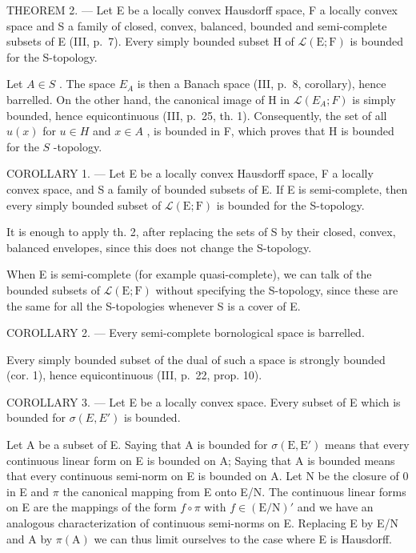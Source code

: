 THEOREM 2. --- Let E be a locally convex Hausdorff space, F a locally convex space and S a family of closed, convex, balanced, bounded and semi-complete subsets of E (III, p.~7). Every simply bounded subset H of \(\mathcal{L}(\mathrm{E};\mathrm{F})\) is bounded for the S-topology.

Let \(A \in S\) . The space \(E_A\) is then a Banach space (III, p.~8, corollary), hence barrelled. On the other hand, the canonical image of H in \(\mathcal{L}(E_A; F)\) is simply bounded, hence equicontinuous (III, p.~25, th. 1). Consequently, the set of all \(u(x)\) for \(u \in H\) and \(x \in A\) , is bounded in F, which proves that H is bounded for the \(S\) -topology.

COROLLARY 1. --- Let E be a locally convex Hausdorff space, F a locally convex space, and S a family of bounded subsets of E. If E is semi-complete, then every simply bounded subset of \(\mathcal{L}(\mathrm{E};\mathrm{F})\) is bounded for the S-topology.

It is enough to apply th. 2, after replacing the sets of S by their closed, convex, balanced envelopes, since this does not change the S-topology.

When E is semi-complete (for example quasi-complete), we can talk of the bounded subsets of \(\mathcal{L}(\mathrm{E};\mathrm{F})\) without specifying the S-topology, since these are the same for all the S-topologies whenever S is a cover of E.

COROLLARY 2. --- Every semi-complete bornological space is barrelled.

Every simply bounded subset of the dual of such a space is strongly bounded (cor. 1), hence equicontinuous (III, p.~22, prop. 10).

COROLLARY 3. --- Let E be a locally convex space. Every subset of E which is bounded for \(\sigma(E, E')\) is bounded.

Let A be a subset of E. Saying that A is bounded for \(\sigma(\mathrm{E}, \mathrm{E}')\) means that every continuous linear form on E is bounded on A; Saying that A is bounded means that every continuous semi-norm on E is bounded on A. Let N be the closure of 0 in E and \(\pi\) the canonical mapping from E onto E/N. The continuous linear forms on E are the mappings of the form \(f \circ \pi\) with \(f \in (\mathrm{E}/\mathrm{N})'\) and we have an analogous characterization of continuous semi-norms on E. Replacing E by E/N and A by \(\pi(\mathrm{A})\) we can thus limit ourselves to the case where E is Hausdorff.

